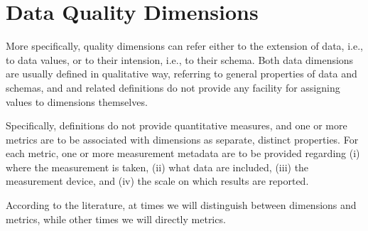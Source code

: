 \chapter{Data Quality Dimensions}

\ifpdf
    \graphicspath{{Chapter2/Figs/Raster/}{Chapter2/Figs/PDF/}{Chapter2/Figs/}}
\else
    \graphicspath{{Chapter2/Figs/Vector/}{Chapter2/Figs/}}
\fi

More specifically, quality dimensions can refer either to the extension of data, i.e., to data values, or to their 
intension, i.e., to their schema. Both data dimensions are usually defined in qualitative way, referring to general properties of data and schemas,
and and related definitions do not provide any facility for assigning values to dimensions themselves. 

Specifically, definitions do not provide quantitative measures, and one or more metrics are to be associated with dimensions as separate, distinct 
properties. For each metric, one or more measurement metadata are to be provided regarding (i) where the measurement is taken, (ii) what data are included, 
(iii) the measurement device, and (iv) the scale on which results are reported.

According to the literature, at times we will distinguish between dimensions and metrics, while other times we will directly metrics.


